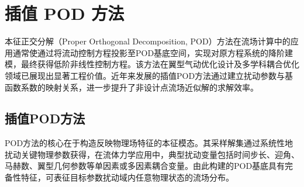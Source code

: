 \chapter{插值 POD 方法}
\label{cha:sysu-thesis-latex-install-guide}
本征正交分解（Proper Orthogonal Decomposition, POD）方法在流场计算中的应用通常使通过将流动控制方程投影至POD基底空间，实现对原方程系统的降阶建模，最终获得低阶非线性控制方程。该方法在翼型气动优化设计及多学科耦合优化领域已展现出显著工程价值。近年来发展的插值POD方法通过建立扰动参数与基函数系数的映射关系，进一步提升了非设计点流场近似解的求解效率。
\section{插值POD方法}
POD方法的核心在于构造反映物理场特征的本征模态。其采样解集通过系统性地扰动关键物理参数获得，在流体力学应用中，典型扰动变量包括时间步长、迎角、马赫数、翼型几何参数等单因素或多因素耦合变量。由此构建的POD基底具有完备性特征，可表征目标参数扰动域内任意物理状态的流场分布。

